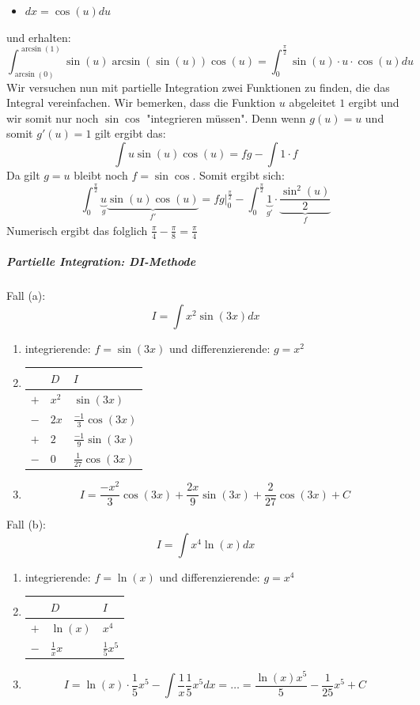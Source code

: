 \documentclass[7pt,landscape, margin = 0.1mm]{article}
\begin{document}
\begin{multicols}{4}
\begin{flushleft}
\begin{flushleft}
\begin{itemize}
\item $dx = \cos(u)du$
\end{itemize}
und erhalten:
$$\int_{\arcsin(0)}^{\arcsin(1)} \sin(u) \arcsin(\sin(u)) \cos(u) = \int_{0}^{\frac{\pi}{2}} \sin(u) \cdot u \cdot \cos(u) du$$
Wir versuchen nun mit partielle Integration zwei Funktionen zu finden, die das Integral vereinfachen. Wir bemerken, dass die Funktion $u$ abgeleitet $1$ ergibt und wir somit nur noch $\sin \cos$ "integrieren müssen". Denn wenn $g(u)=u$ und somit $g'(u)=1$ gilt ergibt das:
$$\int u \sin(u) \cos(u) = fg - \int 1 \cdot f $$
Da gilt $ g =u$ bleibt noch $f=\sin \cos$. Somit ergibt sich:
$$ \int_{0}^{\frac{\pi}{2}} \underbrace{u}_{g} \underbrace{\sin(u) \cos(u)}_{f'} = \left. fg \right|_{0}^{\frac{\pi}{2}} -  \int_{0}^{\frac{\pi}{2}} \underbrace{1}_{g'} \cdot \underbrace{\frac{\sin^2(u)}{2}}_{f}  $$
Numerisch ergibt das folglich $\frac{\pi}{4}-\frac{\pi}{8}=\frac{\pi }{4}$
\vspace{1mm} \hline \vspace{1mm}
\subparagraph{Partielle Integration: DI-Methode}

Fall (a):\\
$$I = \int x^2 \sin(3x)dx$$
\begin{enumerate}
\item integrierende: $f=\sin(3x)$ und differenzierende: $g=x^2$
\item 
\begin{center}

\begin{tabular}{l|ll}
    & $D$ & $I$ \\ \hline
$+$   & $x^2$   & $\sin(3x)$   \\
$-$   &  $2x$ &  $\frac{-1}{3}\cos(3x)$ \\ 
$+$   & $2$  &   $\frac{-1}{9} \sin(3x)$ \\ 
$-$   & $0$ &  $\frac{1}{27}  \cos(3x)$ \\ 

\end{tabular}
\end{center}
\item 
$$I = \frac{-x^2}{3}\cos(3x)+ \frac{2x}{9}\sin(3x)+\frac{2}{27}\cos(3x)+C$$
\end{enumerate}
Fall (b):\\
$$I = \int x^4 \ln(x)dx$$
\begin{enumerate}
\item integrierende: $f=\ln(x)$ und differenzierende: $g=x^4$
\item
\begin{center}
\begin{tabular}{l|ll}
    & $D$ & $I$ \\ \hline
$+$   & $\ln(x)$   & $x^4$   \\
$-$   &  $\frac{1}{x}x$ &  $\frac{1}{5}x^5$ \\ 
 \end{tabular}
\end{center}
\item
$$I= \ln(x)\cdot \frac{1}{5}x^5 - \int \frac{1}{x} \frac{1}{5}x^5 dx = \ldots = \frac{\ln(x) x^5}{5} - \frac{1}{25}x^5 +C$$


\end{enumerate}
\end{flushleft}
\end{flushleft}
\end{multicols}
\end{document}
